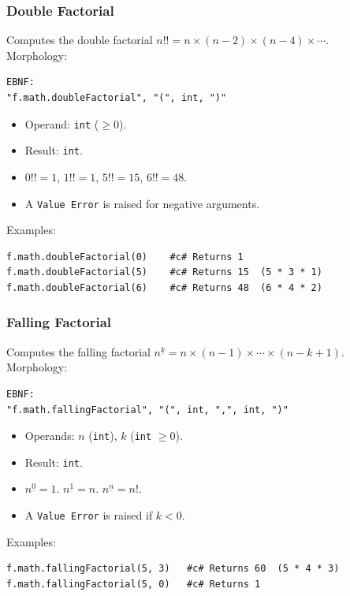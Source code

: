 \subsubsection{Double Factorial}
Computes the double factorial $n!! = n \times (n-2) \times (n-4) \times \cdots$. \\
Morphology:
\begin{verbatim}
EBNF:
"f.math.doubleFactorial", "(", int, ")"
\end{verbatim}
\begin{itemize}
\item Operand: \texttt{int} ($\geq 0$).
\item Result: \texttt{int}.
\item $0!! = 1$, $1!! = 1$, $5!! = 15$, $6!! = 48$.
\item A \texttt{Value Error} is raised for negative arguments.
\end{itemize}
Examples:
\begin{verbatim}
f.math.doubleFactorial(0)    #c# Returns 1
f.math.doubleFactorial(5)    #c# Returns 15  (5 * 3 * 1)
f.math.doubleFactorial(6)    #c# Returns 48  (6 * 4 * 2)
\end{verbatim}

\subsubsection{Falling Factorial}
Computes the falling factorial $n^{\underline{k}} = n \times (n-1) \times \cdots \times (n-k+1)$. \\
Morphology:
\begin{verbatim}
EBNF:
"f.math.fallingFactorial", "(", int, ",", int, ")"
\end{verbatim}
\begin{itemize}
\item Operands: $n$ (\texttt{int}), $k$ (\texttt{int} $\geq 0$).
\item Result: \texttt{int}.
\item $n^{\underline{0}} = 1$. $n^{\underline{1}} = n$. $n^{\underline{n}} = n!$.
\item A \texttt{Value Error} is raised if $k < 0$.
\end{itemize}
Examples:
\begin{verbatim}
f.math.fallingFactorial(5, 3)   #c# Returns 60  (5 * 4 * 3)
f.math.fallingFactorial(5, 0)   #c# Returns 1
\end{verbatim}

